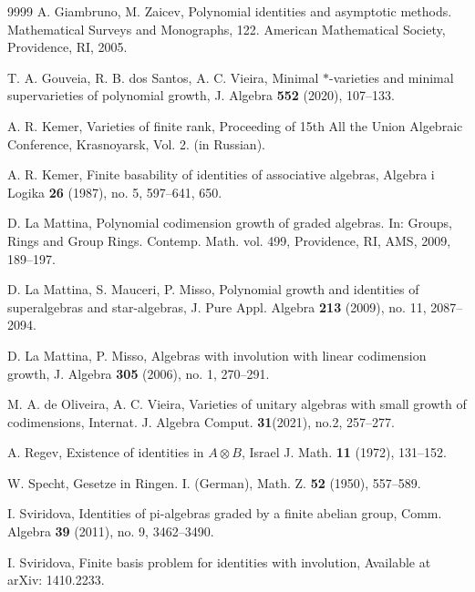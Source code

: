 \documentclass{amsart}
\theoremstyle{definition}
\theoremstyle{remark}
\numberwithin{equation}{section}
\begin{document}
\begin{thebibliography}{9999}
	A. Giambruno, M. Zaicev,
	Polynomial identities and asymptotic methods.
	Mathematical Surveys and Monographs, 122. American Mathematical Society, Providence, RI, 2005.
	
	T. A. Gouveia, R. B. dos Santos, A. C. Vieira,
	Minimal  $*$-varieties and minimal supervarieties of polynomial growth,
	J. Algebra {\bf 552} (2020), 107–133.
	
	A. R. Kemer,
	Varieties of finite rank, 
	Proceeding of 15th All the Union Algebraic Conference, Krasnoyarsk, Vol. 2. (in Russian).
	
	A. R. Kemer,
	Finite basability of identities of associative algebras,
	Algebra i Logika {\bf 26} (1987), no. 5, 597–641, 650.
	
	D. La Mattina,
	Polynomial codimension growth of graded algebras. 
	In: Groups, Rings and Group Rings. Contemp. Math. vol. 499, Providence, RI, AMS, 2009,  189–197.
	
	D. La Mattina, S. Mauceri, P. Misso,
	Polynomial growth and identities of superalgebras and star-algebras,
	J. Pure Appl. Algebra {\bf 213} (2009), no. 11, 2087–2094.
	
	D. La Mattina, P. Misso,
	Algebras with involution with linear codimension growth,
	J. Algebra {\bf 305} (2006), no. 1, 270–291.
	
	M. A. de Oliveira, A. C. Vieira,
	Varieties of unitary algebras with small growth of codimensions,
	Internat. J. Algebra Comput. \textbf{31}(2021), no.2, 257--277.
	
	A. Regev, 
	Existence of identities in $A\otimes B$,
	Israel J. Math. {\bf 11} (1972), 131--152. 																	
	
	W. Specht, 
	Gesetze in Ringen. I. (German), 
	Math. Z. {\bf 52} (1950), 557--589.
	
	I. Sviridova,
	Identities of pi-algebras graded by a finite abelian group,
	Comm. Algebra {\bf 39} (2011), no. 9, 3462–3490.
	
	I. Sviridova,
	Finite basis problem for identities with involution,
	Available at arXiv: 1410.2233.
	
\end{thebibliography}
\end{document}
